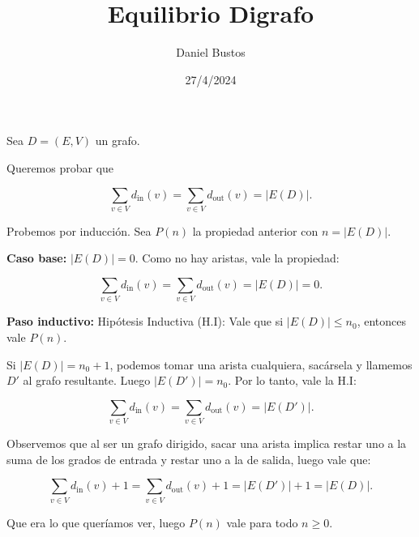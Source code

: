 \documentclass{article}
\begin{document}
\title{Equilibrio Digrafo}
\author{Daniel Bustos}
\date{27/4/2024}
\maketitle

Sea \( D = (E,V) \) un grafo.

Queremos probar que 

\[
\sum_{v \in V} d_{\text{in}}(v) = \sum_{v \in V} d_{\text{out}}(v) = |E(D)|.
\]

Probemos por inducción. Sea \( P(n) \) la propiedad anterior con \( n = |E(D)| \).

\textbf{Caso base:} \( |E(D)| = 0 \). Como no hay aristas, vale la propiedad:

\[
\sum_{v \in V} d_{\text{in}}(v) = \sum_{v \in V} d_{\text{out}}(v) = |E(D)| = 0.
\]

\bigskip

\textbf{Paso inductivo:} Hipótesis Inductiva (H.I): Vale que si \( |E(D)| \leq n_0 \), entonces vale \( P(n) \).

Si \( |E(D)| = n_0 + 1 \), podemos tomar una arista cualquiera, sacársela y llamemos \( D' \) al grafo resultante. Luego \( |E(D')| = n_0 \). Por lo tanto, vale la H.I: 

\[
\sum_{v \in V} d_{\text{in}}(v) = \sum_{v \in V} d_{\text{out}}(v) = |E(D')|.
\]

Observemos que al ser un grafo dirigido, sacar una arista implica restar uno a la suma de los grados de entrada y restar uno a la de salida, luego vale que:

\[
\sum_{v \in V} d_{\text{in}}(v) + 1 = \sum_{v \in V} d_{\text{out}}(v) + 1 = |E(D')| + 1 = |E(D)|.
\]

Que era lo que queríamos ver, luego \( P(n) \) vale para todo \( n \geq 0 \).
\end{document}
